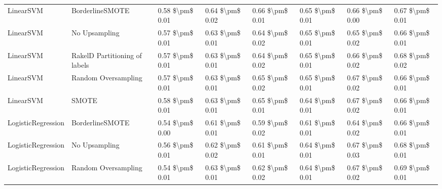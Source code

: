 \begin{tabular}{llllllll}
                      LinearSVM &               BorderlineSMOTE & 0.58 \$\textbackslash pm\$ 0.01 &           0.64 \$\textbackslash pm\$ 0.02 &       0.66 \$\textbackslash pm\$ 0.01 &        0.65 \$\textbackslash pm\$ 0.01 &                         0.66 \$\textbackslash pm\$ 0.00 &     0.67 \$\textbackslash pm\$ 0.01 \\
                      LinearSVM &                 No Upsampling & 0.57 \$\textbackslash pm\$ 0.01 &           0.63 \$\textbackslash pm\$ 0.01 &       0.64 \$\textbackslash pm\$ 0.02 &        0.65 \$\textbackslash pm\$ 0.01 &                         0.65 \$\textbackslash pm\$ 0.02 &     0.66 \$\textbackslash pm\$ 0.01 \\
                      LinearSVM & RakelD Partitioning of labels & 0.57 \$\textbackslash pm\$ 0.01 &           0.63 \$\textbackslash pm\$ 0.01 &       0.64 \$\textbackslash pm\$ 0.02 &        0.65 \$\textbackslash pm\$ 0.01 &                         0.66 \$\textbackslash pm\$ 0.02 &     0.68 \$\textbackslash pm\$ 0.02 \\
                      LinearSVM &           Random Oversampling & 0.57 \$\textbackslash pm\$ 0.01 &           0.63 \$\textbackslash pm\$ 0.01 &       0.65 \$\textbackslash pm\$ 0.02 &        0.65 \$\textbackslash pm\$ 0.01 &                         0.67 \$\textbackslash pm\$ 0.02 &     0.66 \$\textbackslash pm\$ 0.01 \\
                      LinearSVM &                         SMOTE & 0.58 \$\textbackslash pm\$ 0.01 &           0.63 \$\textbackslash pm\$ 0.01 &       0.65 \$\textbackslash pm\$ 0.01 &        0.64 \$\textbackslash pm\$ 0.01 &                         0.67 \$\textbackslash pm\$ 0.02 &     0.66 \$\textbackslash pm\$ 0.01 \\
             LogisticRegression &               BorderlineSMOTE & 0.54 \$\textbackslash pm\$ 0.00 &           0.61 \$\textbackslash pm\$ 0.01 &       0.59 \$\textbackslash pm\$ 0.02 &        0.61 \$\textbackslash pm\$ 0.01 &                         0.64 \$\textbackslash pm\$ 0.02 &     0.66 \$\textbackslash pm\$ 0.01 \\
             LogisticRegression &                 No Upsampling & 0.56 \$\textbackslash pm\$ 0.01 &           0.62 \$\textbackslash pm\$ 0.02 &       0.61 \$\textbackslash pm\$ 0.01 &        0.64 \$\textbackslash pm\$ 0.01 &                         0.67 \$\textbackslash pm\$ 0.03 &     0.68 \$\textbackslash pm\$ 0.01 \\
             LogisticRegression &           Random Oversampling & 0.54 \$\textbackslash pm\$ 0.01 &           0.63 \$\textbackslash pm\$ 0.01 &       0.62 \$\textbackslash pm\$ 0.02 &        0.64 \$\textbackslash pm\$ 0.01 &                         0.67 \$\textbackslash pm\$ 0.02 &     0.69 \$\textbackslash pm\$ 0.01 \\

\end{tabular}
